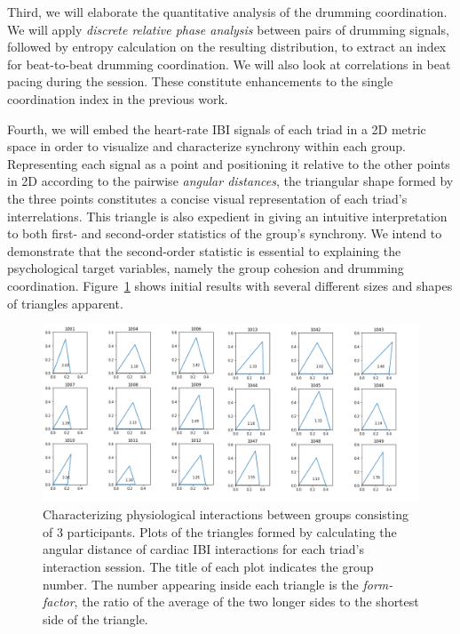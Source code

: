 \documentclass[a4paper, 11pt]{report}      %
\begin{document}
Third, we will elaborate the quantitative analysis of the drumming coordination. We will apply \emph{discrete relative phase analysis} \citep{abp2017symmetry} between pairs of drumming signals, followed by entropy calculation on the resulting distribution, to extract an index for beat-to-beat drumming coordination. We will also look at correlations in beat pacing during the session. These constitute enhancements to the single coordination index in the previous work.

Fourth, we will embed the heart-rate IBI signals of each triad in a 2D metric space in order to visualize and characterize synchrony within each group. Representing each signal as a point and positioning it relative to the other points in 2D according to the pairwise \emph{angular distances}, the triangular shape formed by the three points constitutes a concise  visual representation of each triad's interrelations. This triangle is also expedient in giving an intuitive interpretation to both first- and second-order statistics of the group's synchrony. We intend to demonstrate that the second-order statistic is essential to explaining the psychological target variables, namely the group cohesion and drumming coordination. Figure~\ref{fig:triangles} shows initial results with several different sizes and shapes of triangles apparent. 


\begin{figure}[h]
    \centering
    \includegraphics[scale=0.35]{triangles_coupling_modes_landscape.png}
    \caption{Characterizing physiological interactions between groups consisting of 3 participants. Plots of the triangles formed by calculating the angular distance of cardiac IBI interactions for each triad's interaction session. The title of each plot indicates the group number. The number appearing inside each triangle is the \emph{form-factor}, the ratio of the average of the two longer sides to the shortest side of the triangle.} 
    \label{fig:triangles}
\end{figure}
\end{document}
